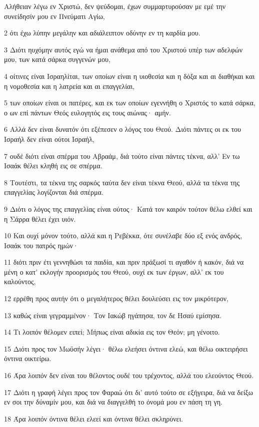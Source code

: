 \par Αλήθειαν λέγω εν Χριστώ, δεν ψεύδομαι, έχων συμμαρτυρούσαν με εμέ την συνείδησίν μου εν Πνεύματι Αγίω,
\par 2 ότι έχω λύπην μεγάλην και αδιάλειπτον οδύνην εν τη καρδία μου.
\par 3 Διότι ηυχόμην αυτός εγώ να ήμαι ανάθεμα από του Χριστού υπέρ των αδελφών μου, των κατά σάρκα συγγενών μου,
\par 4 οίτινες είναι Ισραηλίται, των οποίων είναι η υιοθεσία και η δόξα και αι διαθήκαι και η νομοθεσία και η λατρεία και αι επαγγελίαι,
\par 5 των οποίων είναι οι πατέρες, και εκ των οποίων εγεννήθη ο Χριστός το κατά σάρκα, ο ων επί πάντων Θεός ευλογητός εις τους αιώνας· αμήν.
\par 6 Αλλά δεν είναι δυνατόν ότι εξέπεσεν ο λόγος του Θεού. Διότι πάντες οι εκ του Ισραήλ δεν είναι ούτοι Ισραήλ,
\par 7 ουδέ διότι είναι σπέρμα του Αβραάμ, διά τούτο είναι πάντες τέκνα, αλλ' Εν τω Ισαάκ θέλει κληθή εις σε σπέρμα.
\par 8 Τουτέστι, τα τέκνα της σαρκός ταύτα δεν είναι τέκνα Θεού, αλλά τα τέκνα της επαγγελίας λογίζονται διά σπέρμα.
\par 9 Διότι ο λόγος της επαγγελίας είναι ούτος· Κατά τον καιρόν τούτον θέλω ελθεί και η Σάρρα θέλει έχει υιόν.
\par 10 Και ουχί μόνον τούτο, αλλά και η Ρεβέκκα, ότε συνέλαβε δύο εξ ενός ανδρός, Ισαάκ του πατρός ημών·
\par 11 διότι πριν έτι γεννηθώσι τα παιδία, και πριν πράξωσί τι αγαθόν ή κακόν, διά να μένη ο κατ' εκλογήν προορισμός του Θεού, ουχί εκ των έργων, αλλ' εκ του καλούντος,
\par 12 ερρέθη προς αυτήν ότι ο μεγαλήτερος θέλει δουλεύσει εις τον μικρότερον,
\par 13 καθώς είναι γεγραμμένον· Τον Ιακώβ ηγάπησα, τον δε Ησαύ εμίσησα.
\par 14 Τι λοιπόν θέλομεν ειπεί; Μήπως είναι αδικία εις τον Θεόν; μη γένοιτο.
\par 15 Διότι προς τον Μωϋσήν λέγει· θέλω ελεήσει όντινα ελεώ, και θέλω οικτειρήσει όντινα οικτείρω.
\par 16 Άρα λοιπόν δεν είναι του θέλοντος ουδέ του τρέχοντος, αλλά του ελεούντος Θεού.
\par 17 Διότι η γραφή λέγει προς τον Φαραώ ότι δι' αυτό τούτο σε εξήγειρα, διά να δείξω εν σοι την δύναμίν μου, και διά να διαγγελθή το όνομά μου εν πάση τη γη.
\par 18 Άρα λοιπόν όντινα θέλει ελεεί και όντινα θέλει σκληρύνει.
